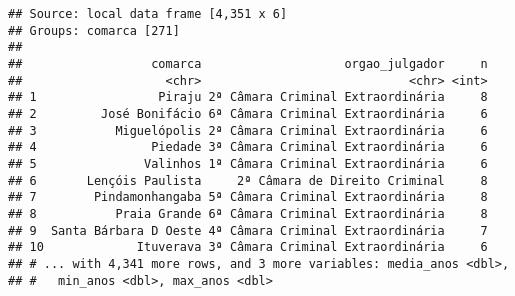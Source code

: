 \documentclass[]{book}
\newenvironment{Shaded}{\begin{snugshade}}{\end{snugshade}}
\newcommand{\KeywordTok}[1]{\textcolor[rgb]{0.13,0.29,0.53}{\textbf{{#1}}}}
\newcommand{\DataTypeTok}[1]{\textcolor[rgb]{0.13,0.29,0.53}{{#1}}}
\newcommand{\DecValTok}[1]{\textcolor[rgb]{0.00,0.00,0.81}{{#1}}}
\newcommand{\StringTok}[1]{\textcolor[rgb]{0.31,0.60,0.02}{{#1}}}
\newcommand{\NormalTok}[1]{{#1}}
\begin{document}
\begin{Shaded}
\end{Shaded}

\begin{verbatim}
## Source: local data frame [4,351 x 6]
## Groups: comarca [271]
## 
##                  comarca                    orgao_julgador     n
##                    <chr>                             <chr> <int>
## 1                 Piraju 2ª Câmara Criminal Extraordinária     8
## 2         José Bonifácio 6ª Câmara Criminal Extraordinária     6
## 3           Miguelópolis 2ª Câmara Criminal Extraordinária     6
## 4                Piedade 3ª Câmara Criminal Extraordinária     6
## 5               Valinhos 1ª Câmara Criminal Extraordinária     6
## 6       Lençóis Paulista     2ª Câmara de Direito Criminal     8
## 7        Pindamonhangaba 5ª Câmara Criminal Extraordinária     8
## 8           Praia Grande 6ª Câmara Criminal Extraordinária     8
## 9  Santa Bárbara D Oeste 4ª Câmara Criminal Extraordinária     7
## 10             Ituverava 3ª Câmara Criminal Extraordinária     6
## # ... with 4,341 more rows, and 3 more variables: media_anos <dbl>,
## #   min_anos <dbl>, max_anos <dbl>
\end{verbatim}
\end{document}
